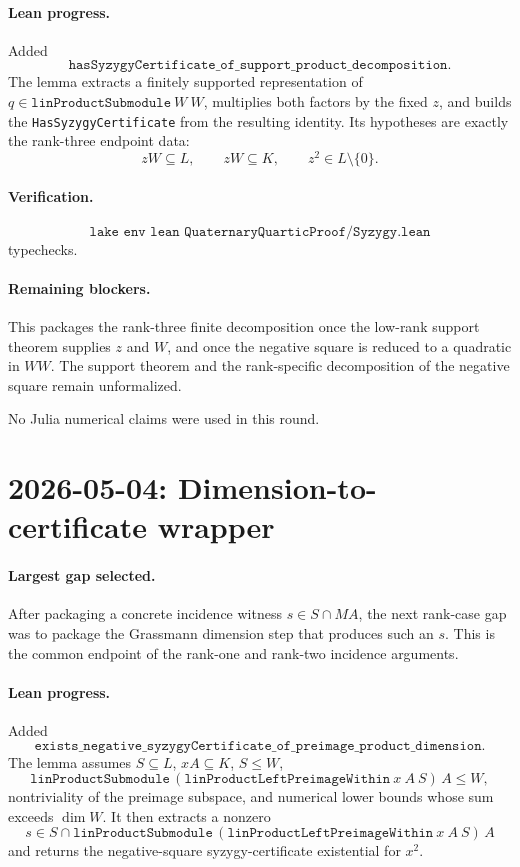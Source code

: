 \documentclass[11pt]{article}
\begin{document}
\paragraph{Lean progress.}
Added
\[
\texttt{hasSyzygyCertificate\_of\_support\_product\_decomposition}.
\]
The lemma extracts a finitely supported representation of
\(q\in\texttt{linProductSubmodule}\ W\ W\), multiplies both factors by the
fixed \(z\), and builds the \texttt{HasSyzygyCertificate} from the resulting
identity.  Its hypotheses are exactly the rank-three endpoint data:
\[
zW\subseteq L,\qquad zW\subseteq K,\qquad z^2\in L\setminus\{0\}.
\]

\paragraph{Verification.}
\[
\texttt{lake env lean QuaternaryQuarticProof/Syzygy.lean}
\]
typechecks.

\paragraph{Remaining blockers.}
This packages the rank-three finite decomposition once the low-rank support
theorem supplies \(z\) and \(W\), and once the negative square is reduced to a
quadratic in \(WW\).  The support theorem and the rank-specific decomposition
of the negative square remain unformalized.

No Julia numerical claims were used in this round.

\section*{2026-05-04: Dimension-to-certificate wrapper}

\paragraph{Largest gap selected.}
After packaging a concrete incidence witness \(s\in S\cap MA\), the next
rank-case gap was to package the Grassmann dimension step that produces such
an \(s\).  This is the common endpoint of the rank-one and rank-two incidence
arguments.

\paragraph{Lean progress.}
Added
\[
\texttt{exists\_negative\_syzygyCertificate\_of\_preimage\_product\_dimension}.
\]
The lemma assumes \(S\subseteq L\), \(xA\subseteq K\), \(S\le W\),
\[
\texttt{linProductSubmodule}\,
  (\texttt{linProductLeftPreimageWithin}\ x\ A\ S)\,A \le W,
\]
nontriviality of the preimage subspace, and numerical lower bounds whose sum
exceeds \(\dim W\).  It then extracts a nonzero
\[
s\in S\cap
\texttt{linProductSubmodule}\,
  (\texttt{linProductLeftPreimageWithin}\ x\ A\ S)\,A
\]
and returns the negative-square syzygy-certificate existential for \(x^2\).
\end{document}
